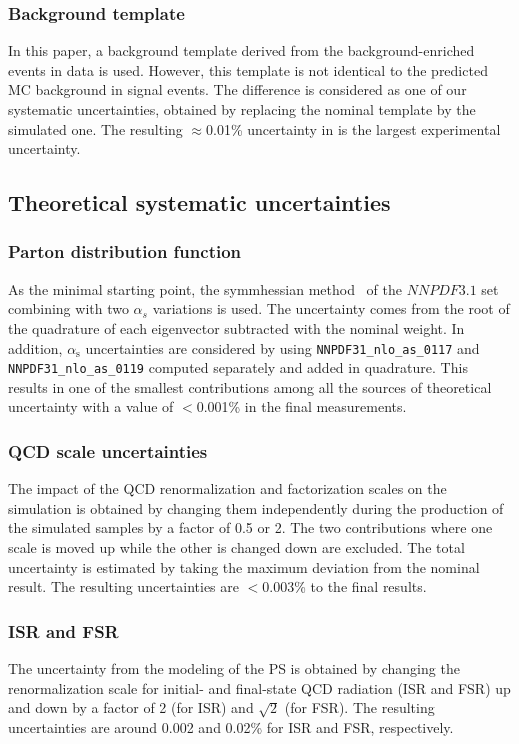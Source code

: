 \subsubsection{Background template}
In this paper, a background template derived from the background-enriched events in data is used.
However, this template is not identical to the predicted MC background in signal events.
The difference is considered as one of our systematic uncertainties, obtained by replacing the nominal template by the simulated one.
The resulting $\approx$0.01\% uncertainty in \Acpprime is the largest experimental uncertainty.

\subsection{Theoretical systematic uncertainties}
\subsubsection{Parton distribution function}
As the minimal starting point, the symmhessian method~\cite{CMS:symmhessian} of the $NNPDF3.1$ set combining with two $\alpha_s$ variations is used.
The uncertainty comes from the root of the quadrature of each eigenvector subtracted with the nominal weight.
In addition, $\alpha_\text{s}$ uncertainties are considered by using \texttt{NNPDF31\_nlo\_as\_0117} and \texttt{NNPDF31\_nlo\_as\_0119} computed separately and added in quadrature.
This results in one of the smallest contributions among all the sources of theoretical uncertainty with a value of $<$0.001\% in the final \Acpprime measurements.

\subsubsection{QCD scale uncertainties}
The impact of the QCD renormalization and factorization scales on the \ttbar simulation is obtained by changing them independently during the production of the simulated samples by a factor of 0.5 or 2.
The two contributions where one scale is moved up while the other is changed down are excluded.
The total uncertainty is estimated by taking the maximum deviation from the nominal result.
The resulting uncertainties are $<$0.003\% to the final results.

\subsubsection{ISR and FSR}
The uncertainty from the modeling of the PS is obtained by changing the renormalization scale for initial- and final-state QCD radiation (ISR and FSR) up and down by a factor of 2 (for ISR) and $\sqrt{2}$ (for FSR).
The resulting uncertainties are around 0.002 and 0.02\% for ISR and FSR, respectively.

